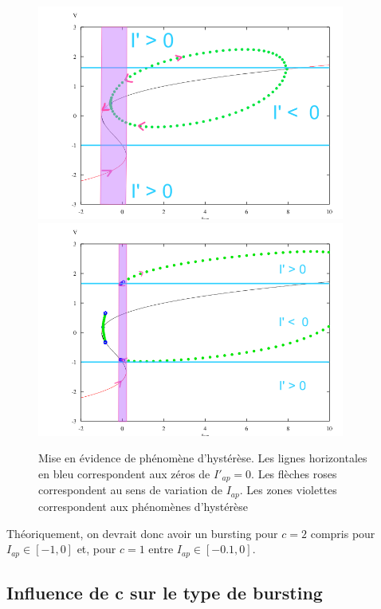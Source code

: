 \documentclass[12pt,a4paper,onecolumn]{article}
\begin{document}
\begin{figure}[H]
	\begin{center}
		\includegraphics[width = 0.9\textwidth]{hysterese_c_2.png}
		\includegraphics[width = 0.9\textwidth]{hysterese_c_1.png}
	\end{center}
	\caption{Mise en évidence de phénomène d'hystérèse. Les lignes horizontales en bleu correspondent aux zéros de $I'_{ap} = 0$. Les flèches roses correspondent au sens de variation de $I_{ap}$. Les zones violettes correspondent aux phénomènes d'hystérèse}
	\label{fig_hysterese}
\end{figure}

Théoriquement, on devrait donc avoir un bursting pour $c=2$ compris pour $I_{ap} \in [-1, 0]$ et, pour $c=1$ entre $I_{ap} \in [-0.1, 0]$.

\subsection{Influence de c sur le type de bursting}
\end{document}
